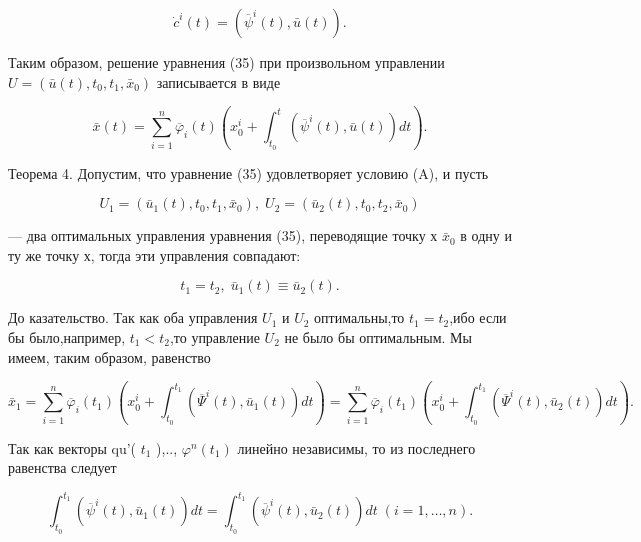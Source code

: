 \documentclass[10pt]{article}
\begin{document}
\[
{\dot{c}}^{i}\left( t\right)  = \left( {{\overline{\psi }}^{i}\left( t\right),\bar{u}\left( t\right) }\right). \tag{43}
\]

Таким образом, решение уравнения (35) при произвольном управлении \(U = \left( {\bar{u}\left( t\right),{t}_{0},{t}_{1},{\bar{x}}_{0}}\right)\) записывается в виде

\[
\bar{x}\left( t\right)  = \mathop{\sum }\limits_{{i = 1}}^{n}{\overline{\varphi }}_{i}\left( t\right) \left( {{x}_{0}^{i} + {\int }_{{t}_{0}}^{t}\left( {{\overline{\psi }}^{i}\left( t\right),\bar{u}\left( t\right) }\right) {dt}}\right). \tag{44}
\]

Теорема 4. Допустим, что уравнение (35) удовлетворяет условию (A), и пусть

\[
{U}_{1} = \left( {{\bar{u}}_{1}\left( t\right),{t}_{0},{t}_{1},{\bar{x}}_{0}}\right),\;{U}_{2} = \left( {{\bar{u}}_{2}\left( t\right),{t}_{0},{t}_{2},{\bar{x}}_{0}}\right)
\]

— два оптимальных управления уравнения (35), переводящие точку х \({\bar{x}}_{0}\) в одну и ту же точку х, тогда эти управления совпадают:

\[
{t}_{1} = {t}_{2},\;{\bar{u}}_{1}\left( t\right)  \equiv  {\bar{u}}_{2}\left( t\right).
\]

До казательство. Так как оба управления \({U}_{1}\) и \({U}_{2}\) оптимальны,то \({t}_{1} = {t}_{2}\),ибо если бы было,например, \({t}_{1} < {t}_{2}\),то управление \({U}_{2}\) не было бы оптимальным. Мы имеем, таким образом, равенство

\[
{\bar{x}}_{1} = \mathop{\sum }\limits_{{i = 1}}^{n}{\overline{\varphi }}_{i}\left( {t}_{1}\right) \left( {{x}_{0}^{i} + {\int }_{{t}_{0}}^{{t}_{1}}\left( {{\overline{\Psi }}^{i}\left( t\right),{\bar{u}}_{1}\left( t\right) }\right) {dt}}\right)  = \mathop{\sum }\limits_{{i = 1}}^{n}{\overline{\varphi }}_{i}\left( {t}_{1}\right) \left( {{x}_{0}^{i} + {\int }_{{t}_{0}}^{{t}_{1}}\left( {{\overline{\Psi }}^{i}\left( t\right),{\bar{u}}_{2}\left( t\right) }\right) {dt}}\right).
\]

Так как векторы qu’( \({t}_{1}\) ),.., \({\varphi }^{n}\left( {t}_{1}\right)\) линейно независимы, то из последнего равенства следует

\[
{\int }_{{t}_{0}}^{{t}_{1}}\left( {{\overline{\psi }}^{i}\left( t\right),{\bar{u}}_{1}\left( t\right) }\right) {dt} = {\int }_{{t}_{0}}^{{t}_{1}}\left( {{\overline{\psi }}^{i}\left( t\right),{\bar{u}}_{2}\left( t\right) }\right) {dt}\;\left( {i = 1,\ldots,n}\right). \tag{45}
\]
\end{document}
